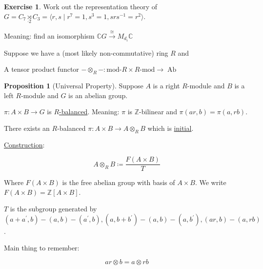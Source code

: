 \documentclass{article}
\theoremstyle{definition}
\newtheorem*{exercise}{Exercise}
\newtheorem{proposition}[theorem]{Proposition}
\begin{document}
\begin{exercise}
    Work out the representation theory of \(G = C_7 \underset{\cdot 2}{\rtimes} C_3 = \langle r,s \mid r^7 = 1, s^3 = 1, s r s ^{-1} = r^2 \rangle\).

    Meaning: find an isomorphism \(\mathbb{C} G \overset{\cong}{\to} M_{d_i}\mathbb{C}\) 
\end{exercise}

Suppose we have a (most likely non-commutative) ring \(R\) and

A tensor product functor \(- \otimes_R - : \text{mod-}R \times R \text{-mod} \to \operatorname{Ab} \) 

\begin{proposition}
    [Universal Property]

    Suppose \(A\) is a right \(R\)-module and \(B\) is a left \(R\)-module and \(G\) is an abelian group.

    \(\pi : A \times B \to G\) is \underline{\(R\)-balanced}. Meaning: \(\pi\) is \(\mathbb{Z}\)-bilinear and \(\pi(ar,b) = \pi(a, rb)\).
    
    There exists an \(R\)-balanced \(\pi : A \times B \to A \otimes_R B\) which is \underline{initial}.

    \begin{center}


    \end{center}
\end{proposition}

\underline{Construction}: 

\[
    A \otimes_R B \coloneqq \frac{F(A \times B)}{T}
\]

Where \(F(A \times B)\) is the free abelian group with basis of \(A \times B\). We write \(F(A \times B) = \mathbb{Z} [A \times B]\).

\(T\) is the subgroup generated by \((a + a^{\prime} , b) - (a,b) - (a^{\prime} ,b), (a,b+b^{\prime})-(a,b)-(a,b^{\prime}), (ar,b)-(a,rb)\).

Main thing to remember:

\[
    \boxed{ar \otimes b = a \otimes rb}
\]
\end{document}
